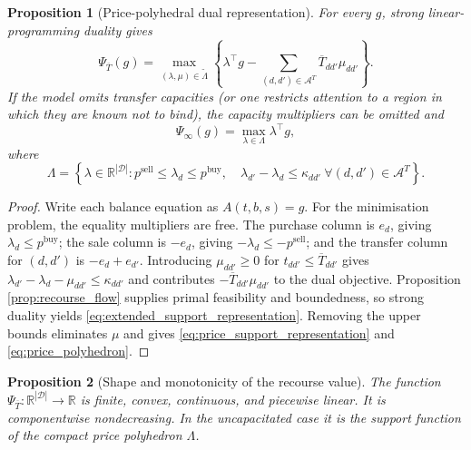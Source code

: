 \documentclass[authoryear,final,3p,times]{elsarticle}
\newtheorem{proposition}{Proposition}
\theoremstyle{definition}
\theoremstyle{plain}
\begin{document}
\begin{proposition}[Price-polyhedral dual representation]
\label{prop:price_polyhedron}
For every $g$, strong linear-programming duality gives
\begin{equation}
\Psi_{\overline T}(g)=
\max_{(\lambda,\mu)\in\widetilde\Lambda}
\left\{
\lambda^\top g-\sum_{(d,d')\in\mathcal A^T}
\overline T_{dd'}\mu_{dd'}
\right\}.
\label{eq:extended_support_representation}
\end{equation}
If the model omits transfer capacities (or one restricts attention to a
region in which they are known not to bind), the capacity multipliers can be
omitted and
\begin{equation}
\Psi_\infty(g)=\max_{\lambda\in\Lambda}\lambda^\top g,
\label{eq:price_support_representation}
\end{equation}
where
\begin{equation}
\Lambda=
\left\{\lambda\in\mathbb R^{|\mathcal D|}:
 p^{\mathrm{sell}}\le\lambda_d\le p^{\mathrm{buy}},\quad
 \lambda_{d'}-\lambda_d\le\kappa_{dd'}
 \ \forall(d,d')\in\mathcal A^T
\right\}.
\label{eq:price_polyhedron}
\end{equation}
\end{proposition}

\begin{proof}
Write each balance equation as
$A(t,b,s)=g$.  For the minimisation problem, the equality multipliers are free.
The purchase column is $e_d$, giving $\lambda_d\le p^{\mathrm{buy}}$; the sale
column is $-e_d$, giving $-\lambda_d\le-p^{\mathrm{sell}}$; and the transfer
column for $(d,d')$ is $-e_d+e_{d'}$.  Introducing
$\mu_{dd'}\ge0$ for $t_{dd'}\le\overline T_{dd'}$ gives
$\lambda_{d'}-\lambda_d-\mu_{dd'}\le\kappa_{dd'}$ and contributes
$-\overline T_{dd'}\mu_{dd'}$ to the dual objective.  Proposition
\ref{prop:recourse_flow} supplies primal feasibility and boundedness, so strong
duality yields \eqref{eq:extended_support_representation}.  Removing the
upper bounds eliminates $\mu$ and gives \eqref{eq:price_support_representation}
and \eqref{eq:price_polyhedron}.
\end{proof}

\begin{proposition}[Shape and monotonicity of the recourse value]
\label{prop:recourse_properties}
The function $\Psi_{\overline T}:\mathbb R^{|\mathcal D|}\to\mathbb R$ is
finite, convex, continuous, and piecewise linear.  It is componentwise
nondecreasing.  In the uncapacitated case it is the support function of the
compact price polyhedron $\Lambda$.
\end{proposition}
\end{document}
